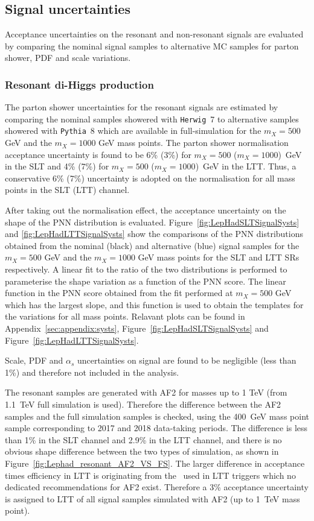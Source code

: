 \subsection{Signal uncertainties}
\label{sec:systematics_signal}

Acceptance uncertainties on the resonant and non-resonant signals 
are evaluated by comparing the nominal signal samples to alternative 
MC samples for parton shower, PDF and scale variations.

\subsubsection{Resonant di-Higgs production}

The parton shower uncertainties for the resonant signals 
are estimated by comparing the nominal samples showered with 
\texttt{Herwig}~7 to alternative samples showered with \texttt{Pythia}~8 which are available 
in full-simulation for the $m_X= 500$ GeV and the $m_X=1000$ GeV mass points. 
The parton shower normalisation acceptance uncertainty is 
found to be 6\% (3\%) for $m_X=500$ ($m_X=1000$)~GeV 
in the SLT and 4\% (7\%) for $m_X= 500$ ($m_X=1000$)~GeV in the LTT. 
Thus, a conservative 6\% (7\%) uncertainty is adopted on the 
normalisation for all mass points in the SLT (LTT) channel.

After taking out the normalisation effect, the acceptance uncertainty on the 
shape of the PNN distribution is evaluated. 
Figure~\ref{fig:LepHadSLTSignalSysts} and \ref{fig:LepHadLTTSignalSysts} 
show the comparisons of the PNN distributions obtained from the 
nominal (black) and alternative (blue) signal samples for the  
$m_X= 500$ GeV and the $m_X=1000$ GeV mass points for the 
SLT and LTT SRs respectively. 
A linear fit to the ratio of the two distributions is 
performed to parameterise the shape variation as a function 
of the PNN score.
The linear function in the PNN score obtained from the fit 
performed at $m_X= 500$ GeV which has the largest slope, 
and this function is used to obtain the 
templates for the variations for all mass points. 
Relavant plots can be found in Appendix~\ref{sec:appendix:systs},
Figure~\ref{fig:LepHadSLTSignalSysts} and Figure~\ref{fig:LepHadLTTSignalSysts}. 

Scale, PDF and $\alpha_s$ uncertainties on signal are found to 
be negligible (less than 1\%) and therefore not included in the analysis. 

The resonant samples are generated with AF2 for masses up to 1 TeV (from \SI{1.1}{\TeV}
full simulation is used). Therefore the difference between the AF2 samples and
the full simulation samples is checked, using the 400~GeV mass point 
sample corresponding to 2017 and 2018 data-taking periods.  
The difference is less than 1\% in the SLT channel
and 2.9\% in the LTT channel, and there is no obvious shape
difference between the two types of simulation, as shown in
Figure~\ref{fig:Lephad_resonant_AF2_VS_FS}. 
The larger difference in acceptance times efficiency in 
LTT is originating from the \tauhad\ used in LTT triggers 
which no dedicated recommendations for AF2 exist.
Therefore a 3\% acceptance uncertainty is assigned to LTT of all signal
samples simulated with AF2 (up to 1~TeV mass point).

